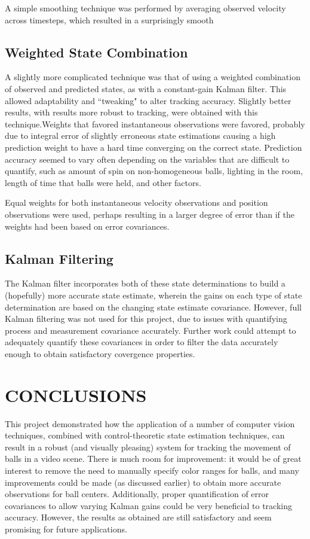 \documentclass[letterpaper, 10 pt, conference]{ieeeconf}  %
\begin{document}
A simple smoothing technique was performed by averaging observed velocity across timesteps, which resulted in a surprisingly smooth 

\subsection{Weighted State Combination}

A slightly more complicated technique was that of using a weighted combination of observed and predicted states, as with a constant-gain Kalman filter. This allowed adaptability and ``tweaking" to alter tracking accuracy. Slightly better results, with results more robust to tracking, were obtained with this technique.Weights that favored instantaneous observations were favored, probably due to integral error of slightly erroneous state estimations causing a high prediction weight to have a hard time converging on the correct state. Prediction accuracy seemed to vary often depending on the variables that are difficult to quantify, such as amount of spin on non-homogeneous balls, lighting in the room, length of time that balls were held, and other factors.

Equal weights for both instantaneous velocity observations and position observations were used, perhaps resulting in a larger degree of error than if the weights had been based on error covariances.

\subsection{Kalman Filtering}

 The Kalman filter incorporates both of these state determinations to build a (hopefully) more accurate state estimate, wherein the gains on each type of state determination are based on the changing state estimate covariance. However, full Kalman filtering was not used for this project, due to issues with quantifying process and measurement covariance accurately. Further work could attempt to adequately quantify these covariances in order to filter the data accurately enough to obtain satisfactory covergence properties.

\section{CONCLUSIONS}

This project demonstrated how the application of a number of computer vision techniques, combined with control-theoretic state estimation techniques, can result in a robust (and visually pleasing) system for tracking the movement of balls in a video scene. There is much room for improvement: it would be of great interest to remove the need to manually specify color ranges for balls, and many improvements could be made (as discussed earlier) to obtain more accurate observations for ball centers. Additionally, proper quantification of error covariances to allow varying Kalman gains could be very beneficial to tracking accuracy. However, the results as obtained are still satisfactory and seem promising for future applications.
\end{document}
